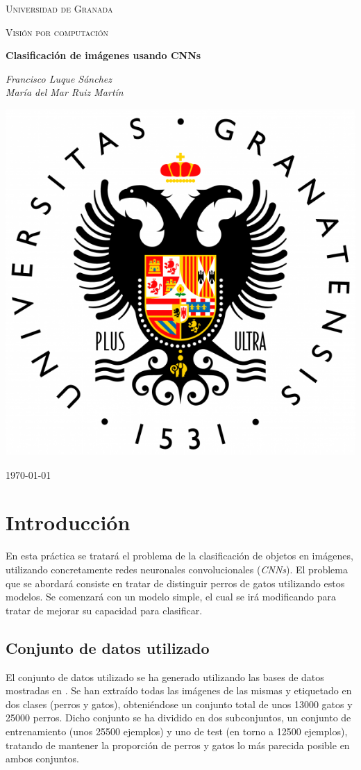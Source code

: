 \documentclass[11pt]{article}
\theoremstyle{plain}
\theoremstyle{definition}
\begin{document}
\begin{titlepage}
  \centering
  {\scshape\LARGE Universidad de Granada \par}
  \vspace{1cm}
  {\scshape\Large Visión por computación \par}
  \vspace{1.5cm}
  {\huge\bfseries Clasificación de imágenes usando CNNs \par}
  \vspace{2cm}
  {\Large\itshape Francisco Luque Sánchez \\
    María del Mar Ruiz Martín\par}
  \vspace{2cm}
  \includegraphics[width=.3\textwidth]{logougr.png}\par\vspace{1cm}
  {\large \today\par}
\end{titlepage}

\newpage

\tableofcontents

\newpage

\section{Introducción}

En esta práctica se tratará el problema de la clasificación de objetos
en imágenes, utilizando concretamente redes neuronales convolucionales
(\textit{CNNs}). El problema que se abordará consiste en tratar de
distinguir perros de gatos utilizando estos modelos. Se comenzará con
un modelo simple, el cual se irá modificando para tratar de mejorar su
capacidad para clasificar.

\subsection{Conjunto de datos utilizado}

El conjunto de datos utilizado se ha generado utilizando las bases de
datos mostradas en \cite{db1, db2, db3}. Se han extraído todas las
imágenes de las mismas y etiquetado en dos clases (perros y gatos),
obteniéndose un conjunto total de unos 13000 gatos y 25000
perros. Dicho conjunto se ha dividido en dos subconjuntos, un conjunto
de entrenamiento (unos 25500 ejemplos) y uno de test (en torno a 12500
ejemplos), tratando de mantener la proporción de perros y gatos lo más
parecida posible en ambos conjuntos.\\
\end{document}

